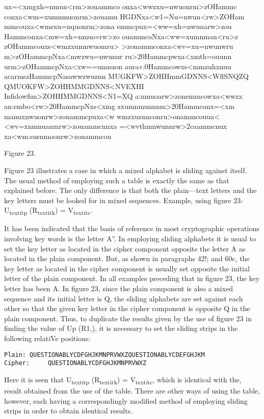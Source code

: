 ux=<xmgxh=nmun<rm>zonammco
onxa<wwzxu=nwuonrm>zOHammc
conxa<wm=xumnmuonrm>zouamu
HGDNxa<w1=Nu=nwun<rw>ZOHam
mmcouxa<wmsxu=nquonrm>zona
emmcpux=<ww=xh=nwunarw>zou
Hammconxa<mw=xh=nmuo«rw>zo
ouammcoNxa<ww=xumnman<ru>z
zOHammcouxs<wmzxumnwuomru>
>zonammconxa<wv=xu=nwunwru
m>zOHammcpNxa<mwzwu=nwunur
ru>20Hammcpwxa<xmth=ouunn
urm>zOHammcpNxa<xw==umnuon
aura»:0Hammcowxs<mmzuhxnuu
acarmszHammcpNasawwzwuznn
MUGKFW>ZOHHmmGDNNS<WﬂSNQZQ
QMUOKFW>ZOHHMMGDNNS<NVEXHI
Inﬁdowﬁm>ZOHHMMGDNNS<N1=XQ
a:nmuoarw>zonemmcowxa<wwzx
an:embo<rw>20HammcpNxs<xmg
zxumnmunnnm>20Hammconx=<xm
manuxnwuonrw>zonammcpuxa<w
wmzxuznnconru>onammcouua<
<wv=xnmnuanmrw>zouammcnnxa
=<wvthmnwunnrw>2caammcnux
xa<wm:susnmoonrw>zonammcou

Figure 23.

\mypara Figure 23 illustrates a case in which a mixed alphabet is sliding
against itself. The usual method of employing such a table is exactly
the same as that explained before. The only difference is that both the
plain—text letters and the key letters must be looked for in mixed
sequences. Example, using ﬁgure 23: U\textsubscript{textit{p}} (R\textsubscript{textit{k}}) = V\textsubscript{textit{c}}.

\mypara It has been indicated that the basis of reference in most cryptographic operations involving key words is the letter A”. In employing
sliding alphabets it is usual to set the key letter as located in the cipher
component opposite the letter A as located in the plain component. But,
as shown in paragraphs 42!; and 60c, the key letter as located in the
cipher component is usually set opposite the initial letter of the plain
component. In all examples preceding that in ﬁgure 23, the key letter has
been A. In ﬁgure 23, since the plain component is also a mixed sequence
and its initial letter is Q, the sliding alphabets are set against each other
so that the given key letter in the cipher component is opposite Q in the
plain component. Thus, to duplicate the results given by the use of ﬁgure
23 in ﬁnding the value of Up (R1,), it is necessary to set the sliding strips
in the following relatiVe positions:

\begin{verbatim}
Plain: QUESTIONABLYCDFGHJKMNPRVWXZQUESTIONABLYCDEFGHJKM
Cipher:     QUESTIONABLYCDFGHJKMNPRVWXZ
\end{verbatim}

Here it is seen that U\textsubscript{textit{p}} (R\textsubscript{textit{k}}) = V\textsubscript{textit{c}}, which is identical with the, result
obtained from the use of the table. There are other ways of using the
table, however, each having a correspondingly modiﬁed method of employing sliding strips in order to obtain identical results.

